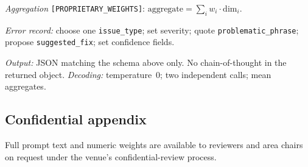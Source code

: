 \documentclass[11pt]{article}
\begin{document}
\textit{Aggregation} \texttt{[PROPRIETARY\_WEIGHTS]}:
$\mathrm{aggregate}=\sum_i w_i\cdot\mathrm{dim}_i$.

\textit{Error record:} choose one \texttt{issue\_type}; set severity; quote
\texttt{problematic\_phrase}; propose \texttt{suggested\_fix}; set confidence
fields.

\textit{Output:} JSON matching the schema above only. No chain-of-thought in the
returned object.
\textit{Decoding:} temperature~0; two independent calls; mean aggregates.

\subsection{Confidential appendix}
Full prompt text and numeric weights are available to reviewers and area chairs
on request under the venue's confidential-review process.


\end{document}
